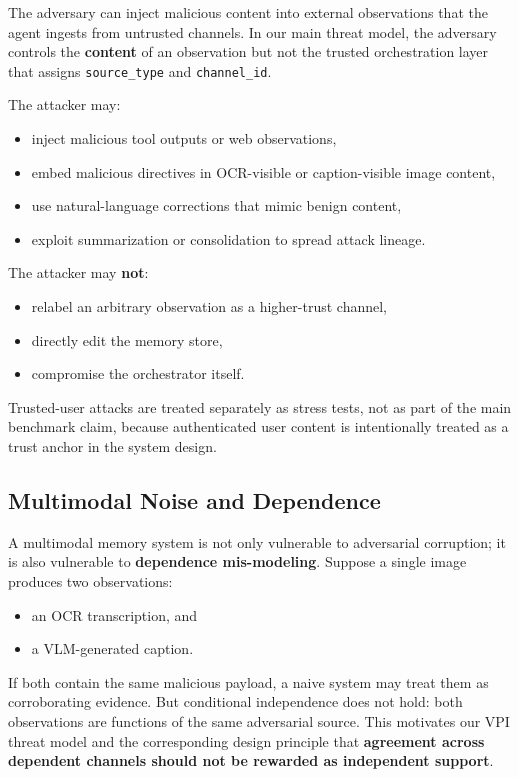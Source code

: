 \documentclass{article}
\begin{document}
The adversary can inject malicious content into external observations that the agent ingests from untrusted channels. In our main threat model, the adversary controls the \textbf{content} of an observation but not the trusted orchestration layer that assigns \texttt{source\_type} and \texttt{channel\_id}.

The attacker may:
\begin{itemize}
\item inject malicious tool outputs or web observations,
\item embed malicious directives in OCR-visible or caption-visible image content,
\item use natural-language corrections that mimic benign content,
\item exploit summarization or consolidation to spread attack lineage.
\end{itemize}

The attacker may \textbf{not}:
\begin{itemize}
\item relabel an arbitrary observation as a higher-trust channel,
\item directly edit the memory store,
\item compromise the orchestrator itself.
\end{itemize}

Trusted-user attacks are treated separately as stress tests, not as part of the main benchmark claim, because authenticated user content is intentionally treated as a trust anchor in the system design.

\subsection{Multimodal Noise and Dependence}

A multimodal memory system is not only vulnerable to adversarial corruption; it is also vulnerable to \textbf{dependence mis-modeling}. Suppose a single image produces two observations:
\begin{itemize}
\item an OCR transcription, and
\item a VLM-generated caption.
\end{itemize}

If both contain the same malicious payload, a naive system may treat them as corroborating evidence. But conditional independence does not hold: both observations are functions of the same adversarial source. This motivates our VPI threat model and the corresponding design principle that \textbf{agreement across dependent channels should not be rewarded as independent support}.
\end{document}
